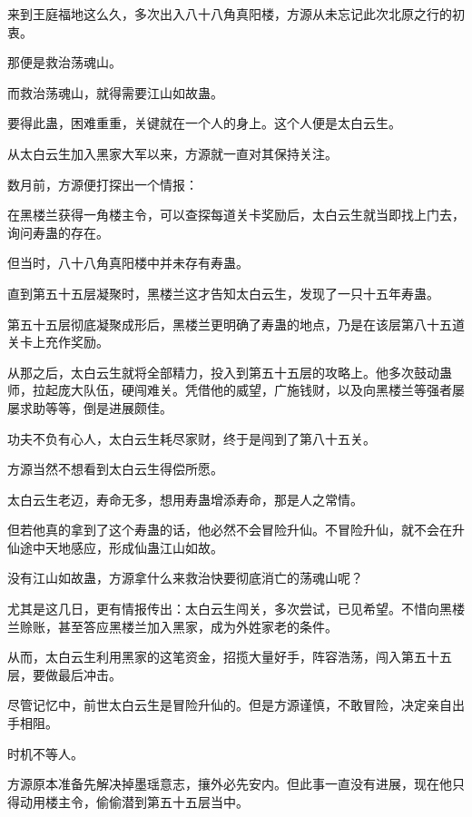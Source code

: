 
\begin{this_body}

来到王庭福地这么久，多次出入八十八角真阳楼，方源从未忘记此次北原之行的初衷。

那便是救治荡魂山。

而救治荡魂山，就得需要江山如故蛊。

要得此蛊，困难重重，关键就在一个人的身上。这个人便是太白云生。

从太白云生加入黑家大军以来，方源就一直对其保持关注。

数月前，方源便打探出一个情报：

在黑楼兰获得一角楼主令，可以查探每道关卡奖励后，太白云生就当即找上门去，询问寿蛊的存在。

但当时，八十八角真阳楼中并未存有寿蛊。

直到第五十五层凝聚时，黑楼兰这才告知太白云生，发现了一只十五年寿蛊。

第五十五层彻底凝聚成形后，黑楼兰更明确了寿蛊的地点，乃是在该层第八十五道关卡上充作奖励。

从那之后，太白云生就将全部精力，投入到第五十五层的攻略上。他多次鼓动蛊师，拉起庞大队伍，硬闯难关。凭借他的威望，广施钱财，以及向黑楼兰等强者屡屡求助等等，倒是进展颇佳。

功夫不负有心人，太白云生耗尽家财，终于是闯到了第八十五关。

方源当然不想看到太白云生得偿所愿。

太白云生老迈，寿命无多，想用寿蛊增添寿命，那是人之常情。

但若他真的拿到了这个寿蛊的话，他必然不会冒险升仙。不冒险升仙，就不会在升仙途中天地感应，形成仙蛊江山如故。

没有江山如故蛊，方源拿什么来救治快要彻底消亡的荡魂山呢？

尤其是这几日，更有情报传出：太白云生闯关，多次尝试，已见希望。不惜向黑楼兰赊账，甚至答应黑楼兰加入黑家，成为外姓家老的条件。

从而，太白云生利用黑家的这笔资金，招揽大量好手，阵容浩荡，闯入第五十五层，要做最后冲击。

尽管记忆中，前世太白云生是冒险升仙的。但是方源谨慎，不敢冒险，决定亲自出手相阻。

时机不等人。

方源原本准备先解决掉墨瑶意志，攘外必先安内。但此事一直没有进展，现在他只得动用楼主令，偷偷潜到第五十五层当中。


\end{this_body}
